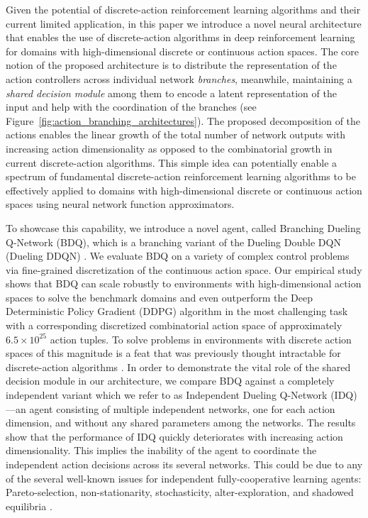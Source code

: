 \documentclass[letterpaper]{article} %
\newcommand{\citep}{\cite}
\begin{document}
Given the potential of discrete-action reinforcement learning algorithms and their current limited application, in this paper we introduce a novel neural architecture that enables the use of discrete-action algorithms in deep reinforcement learning for domains with high-dimensional discrete or continuous action spaces. The core notion of the proposed architecture is to distribute the representation of the action controllers across individual network \textit{branches}, meanwhile, maintaining a \textit{shared decision module} among them to encode a latent representation of the input and help with the coordination of the branches (see Figure~\ref{fig:action_branching_architectures}). The proposed decomposition of the actions enables the linear growth of the total number of network outputs with increasing action dimensionality as opposed to the combinatorial growth in current discrete-action algorithms. This simple idea can potentially enable a spectrum of fundamental discrete-action reinforcement learning algorithms to be effectively applied to domains with high-dimensional discrete or continuous action spaces using neural network function approximators.

To showcase this capability, we introduce a novel agent, called Branching Dueling Q-Network (BDQ), which is a branching variant of the Dueling Double DQN (Dueling DDQN) \citep{Wang:2016}. We evaluate BDQ on a variety of complex control problems via fine-grained discretization of the continuous action space. Our empirical study shows that BDQ can scale robustly to environments with high-dimensional action spaces to solve the benchmark domains and even outperform the Deep Deterministic Policy Gradient (DDPG) algorithm \citep{Lillicrap:2016ddpg} in the most challenging task with a corresponding discretized combinatorial action space of approximately $6.5 \times 10^{25}$ action tuples. To solve problems in environments with discrete action spaces of this magnitude is a feat that was previously thought intractable for discrete-action algorithms \citep{Lillicrap:2016ddpg,Schulman:2017ppo}. In order to demonstrate the vital role of the shared decision module in our architecture, we compare BDQ against a completely independent variant which we refer to as Independent Dueling Q-Network (IDQ)---an agent consisting of multiple independent networks, one for each action dimension, and without any shared parameters among the networks. The results show that the performance of IDQ quickly deteriorates with increasing action dimensionality. This implies the inability of the agent to coordinate the independent action decisions across its several networks. This could be due to any of the several well-known issues for independent fully-cooperative learning agents: Pareto-selection, non-stationarity, stochasticity, alter-exploration, and shadowed equilibria \citep{Matignon:2012independent}.
\end{document}
